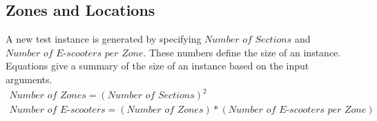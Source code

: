 \subsection{Zones and Locations}
A new test instance is generated by specifying  $\textit{Number of Sections}$ and  $\textit{Number of E-scooters per Zone}$. These numbers define the size of an instance. Equations  give a summary of the size of an instance based on the input arguments.
\\
\begin{equation}\label{eq:sectionsEquations}
\begin{gathered}
    \textit{Number of Zones} = (\textit{Number of Sections})^2 \\
    \textit{Number of E-scooters} = (\textit{Number of Zones}) * (\textit{Number of E-scooters per Zone})
\end{gathered}
\end{equation}


